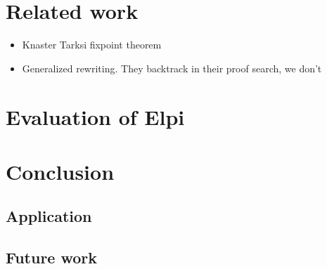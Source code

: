\documentclass[11pt,a4paper]{report}
\begin{document}


\tableofcontents






% 


\chapter{Related work} \label{ch:relatedwork}
\begin{itemize}
    \item Knaster Tarksi fixpoint theorem
    \item Generalized rewriting. They backtrack in their proof search, we don't
\end{itemize}


\chapter{Evaluation of Elpi} \label{ch:evalelpi}

\chapter{Conclusion}\label{ch:conclusion}
\section{Application}
\section{Future work}

\printbibliography

\newpage
\mbox{}
\thispagestyle{empty}
\newpage
\mbox{}
\thispagestyle{empty}
\end{document}
